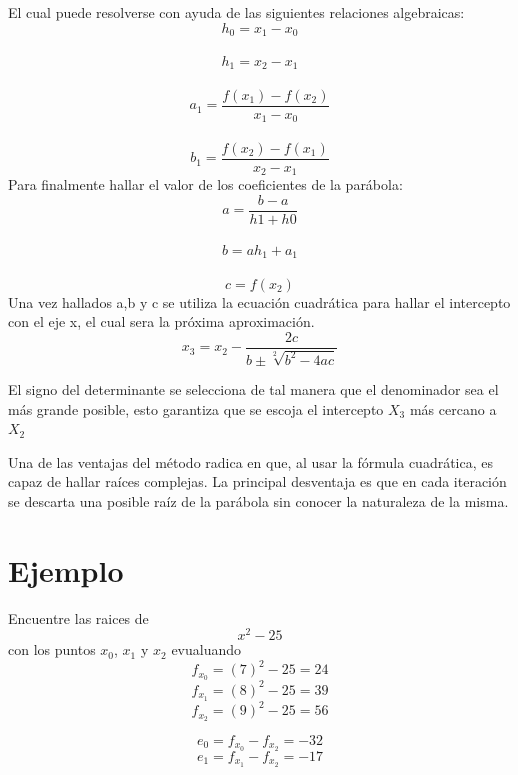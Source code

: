 \documentclass{article}
\begin{document}
\begin{multicols}{2}
El cual puede resolverse con ayuda de las siguientes relaciones algebraicas:
\begin{equation}
h_{0}=x_{1}-x_{0}
\end{equation}
\\
\begin{equation}
h_{1}=x_{2}-x_{1}
\end{equation}
\\
\begin{equation}
a_{1}= \frac{f(x_{1})-f(x_{2})}{x_{1}-x_{0}}
\end{equation}
\\
\begin{equation}
b_{1}= \frac{f(x_{2})-f(x_{1})}{x_{2}-x_{1}}
\end{equation}
Para finalmente hallar el valor de los coeficientes de la parábola:
\begin{equation}
a= \frac{b-a}{h1+h0}
\end{equation}
\\
\begin{equation}
b=ah_{1}+ a_{1}
\end{equation}
\\
\begin{equation}
c=f(x_{2})
\end{equation}
Una vez hallados a,b y c se utiliza la ecuación cuadrática para hallar el intercepto con el eje x, el cual sera la próxima aproximación.
\begin{equation}
x_{3}=x_{2}- \frac{2c}{b\pm \sqrt[2]{b^{2}-4ac}}\end{equation}

El signo del determinante se selecciona de tal manera que el denominador sea el más grande posible, esto garantiza que se escoja el intercepto $X_{3}$ más cercano a $X_{2}$

Una de las ventajas del método radica en que, al usar la fórmula cuadrática, es capaz de hallar raíces complejas. La principal desventaja es que en cada iteración se descarta una posible raíz de la parábola sin conocer la naturaleza de la misma.
\section{Ejemplo}
\label{sec:Ejem}
Encuentre las raices de $$x^{2}-25$$
con los puntos $x_{0}$, $x_{1}$ y $x_{2}$ evualuando $$f_{x_{0}}= (7)^{2}-25=24$$
$$f_{x_{1}}=(8)^{2}-25=39$$
$$f_{x_{2}}=(9)^{2}-25=56$$

$$e_{0}=f_{x_{0}}-f_{x_{2}}=-32$$
$$e_{1}=f_{x_{1}}-f_{x_{2}}=-17$$


\end{multicols}
\end{document}
